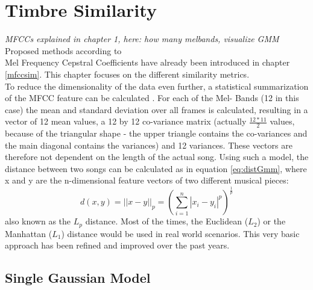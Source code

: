 \chapter{Timbre Similarity} \label{musly}

\textit{MFCCs explained in chapter 1, here: how many melbands, visualize GMM}\\
Proposed methods according to \cite[pp.51ff]{knees1}\\
Mel Frequency Cepstral Coefficients have already been introduced in chapter \ref{mfccsim}. This chapter focuses on the different similarity metrics.\\
To reduce the dimensionality of the data even further, a statistical summarization of the MFCC feature can be calculated \cite[p. 58]{knees1}.
For each of the Mel- Bands (12 in this case) the mean and standard deviation over all frames is calculated, resulting in a vector of 12 mean values, a 12 by 12 co-variance matrix (actually $\frac{12*11}{2}$ values, because of the triangular shape - the upper triangle contains the co-variances and the main diagonal contains the variances) and 12 variances. These vectors are therefore not dependent on the length of the actual song. 
Using such a model, the distance between two songs can be calculated as in equation \ref{eq:distGmm}, where x and y are the n-dimensional feature vectors of two different musical pieces:
\begin{equation} \label{eq:distGmm}
d(x, y) = ||x - y||_p = \left(\sum_{i=1}^{n}{|x_i - y_i|^p}\right)^{\frac{1}{p}}
\end{equation}
also known as the $L_p$ distance. Most of the times, the Euclidean ($L_2$) or the Manhattan ($L_1$) distance would be used in real world scenarios.
This very basic approach has been refined and improved over the past years. 

\section{Single Gaussian Model}

